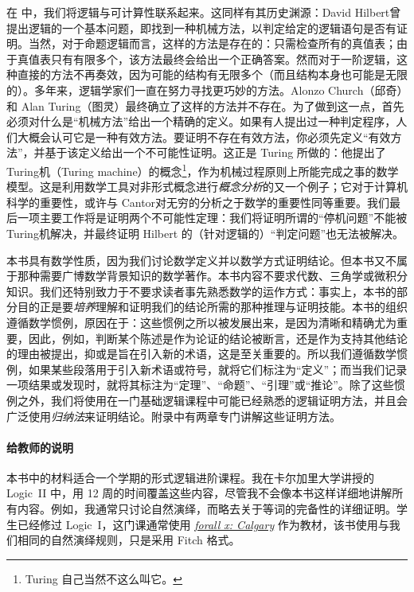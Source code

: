在  中，我们将逻辑与可计算性联系起来。这同样有其历史渊源：David Hilbert曾提出逻辑的一个基本问题，即找到一种机械方法，以判定给定的逻辑语句是否有证明。当然，对于命题逻辑而言，这样的方法是存在的：只需检查所有的真值表；由于真值表只有有限多个，该方法最终会给出一个正确答案。然而对于一阶逻辑，这种直接的方法不再奏效，因为可能的结构有无限多个（而且结构本身也可能是无限的）。多年来，逻辑学家们一直在努力寻找更巧妙的方法。Alonzo Church（邱奇）和 Alan Turing（图灵）最终确立了这样的方法并不存在。为了做到这一点，首先必须对什么是“机械方法”给出一个精确的定义。如果有人提出过一种判定程序，人们大概会认可它是一种有效方法。要证明不存在有效方法，你必须先定义“有效方法”，并基于该定义给出一个不可能性证明。这正是 Turing 所做的：他提出了Turing机（Turing machine）的概念\footnote{Turing 自己当然不这么叫它。}，作为机械过程原则上所能完成之事的数学模型。这是利用数学工具对非形式概念进行\emph{概念分析}的又一个例子；它对于计算机科学的重要性，或许与 Cantor对无穷的分析之于数学的重要性同等重要。我们最后一项主要工作将是证明两个不可能性定理：我们将证明所谓的“停机问题”不能被Turing机解决，并最终证明 Hilbert 的（针对逻辑的）“判定问题”也无法被解决。

本书具有数学性质，因为我们讨论数学定义并以数学方式证明结论。但本书又不属于那种需要广博数学背景知识的数学著作。本书内容不要求代数、三角学或微积分知识。我们还特别致力于不要求读者事先熟悉数学的运作方式：事实上，本书的部分目的正是要\emph{培养}理解和证明我们的结论所需的那种推理与证明技能。本书的组织遵循数学惯例，原因在于：这些惯例之所以被发展出来，是因为清晰和精确尤为重要，因此，例如，判断某个陈述是作为论证的结论被断言，还是作为支持其他结论的理由被提出，抑或是旨在引入新的术语，这是至关重要的。所以我们遵循数学惯例，如果某些段落用于引入新术语或符号，就将它们标注为“定义”；而当我们记录一项结果或发现时，就将其标注为“定理”、“命题”、“引理”或“推论”。除了这些惯例之外，我们将使用在一门基础逻辑课程中可能已经熟悉的逻辑证明方法，并且会广泛使用\emph{归纳法}来证明结论。附录中有两章专门讲解这些证明方法。

\paragraph{给教师的说明}
本书中的材料适合一个学期的形式逻辑进阶课程。我在卡尔加里大学讲授的 Logic~II 中，用 12 周的时间覆盖这些内容，尽管我不会像本书这样详细地讲解所有内容。例如，我通常只讨论自然演绎，而略去关于等词的完备性的详细证明。学生已经修过 Logic~I，这门课通常使用 \emph{\href{https://forallx.openlogicproject.org}{forall x: Calgary}} 作为教材，该书使用与我们相同的自然演绎规则，只是采用 Fitch 格式。

